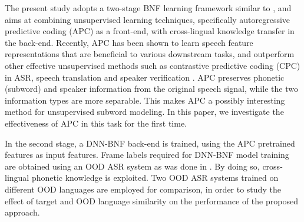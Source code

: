 \documentclass[a4paper]{article}
\begin{document}
The present study  adopts a two-stage BNF learning framework similar to  \cite{Feng2019improving}, and aims at
combining unsupervised   learning techniques, specifically autoregressive predictive coding (APC) as a front-end, with  cross-lingual   knowledge transfer in the back-end. 
Recently, APC   has   been shown   \cite{Chung2019} to learn speech feature representations that are beneficial to 
various downstream   tasks, and outperform other effective
unsupervised methods such as contrastive predictive coding (CPC) \cite{oord2018cpc} 
in ASR, speech translation and speaker verification   \cite{Chung2019generative}.
 APC preserves   phonetic (subword) and speaker information from the original speech signal, while the two information types are more  separable. This makes APC a possibly interesting  method for unsupervised subword modeling. %
In this paper, we investigate the effectiveness of APC in this task for the first time.

In  the second stage, a DNN-BNF back-end is trained, using the APC pretrained features as input features. 
Frame labels required for  DNN-BNF model training are obtained using an OOD  ASR system as was done in \cite{feng2019_TASLP}.  
By doing so, cross-lingual phonetic knowledge is exploited.
Two OOD ASR systems trained on  different OOD languages are employed for comparison, in order to study the effect of target and OOD language similarity on the performance of the proposed approach.
\end{document}
